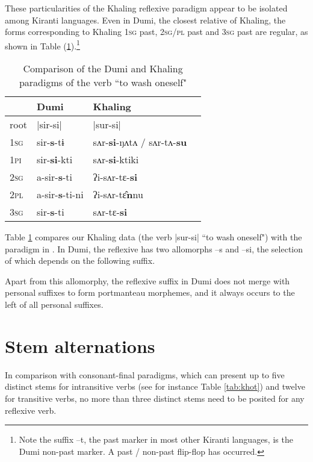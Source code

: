 \documentclass[twoside,a4paper,11pt]{article}
\newcommand{\ipa}[1]{{\phon#1}}
\begin{document}
These particularities of the Khaling reflexive paradigm appear to be isolated among Kiranti languages. Even in Dumi, the closest relative of Khaling, the forms corresponding to Khaling \textsc{1sg} past, \textsc{2sg/pl} past and \textsc{3sg} past are regular, as shown in Table (\ref{tab:dumi-khyal}).\footnote{Note the suffix --\ipa{t}, the past marker in most other Kiranti languages, is the Dumi non-past marker. A past / non-past flip-flop has occurred. } 

\begin{table}[H] \centering
\caption{Comparison of the Dumi and Khaling paradigms of the verb ``to wash oneself"} \label{tab:dumi-khyal}
\begin{tabular}{llll}
\toprule
&	Dumi &	Khaling	\\
\midrule
root & |\ipa{sir-si}| & |\ipa{sur-si}|\\
\midrule
\textsc{1sg} &	\ipa{sir-\textbf{s}-tɨ} &	\ipa{sʌr-\textbf{si}-ŋʌtʌ / sʌr-tʌ-\textbf{su}} &	\\
\textsc{1pi} &	\ipa{sir-\textbf{si}-kti} &	\ipa{sʌr-\textbf{si}-ktiki} &	\\
\textsc{2sg} &	\ipa{a-sir-\textbf{s}-ti} &	\ipa{ʔi-sʌr-tɛ-\textbf{si}} &	\\
\textsc{2pl} &	\ipa{a-sir-\textbf{s}-ti-ni} &	\ipa{ʔi-sʌr-tɛ̂\textbf{n}nu} &	\\
\textsc{3sg} &	\ipa{sir-\textbf{s}-ti} &	\ipa{sʌr-tɛ-\textbf{si}} &	\\
\bottomrule
\end{tabular}
\end{table}


Table \ref{tab:dumi-khyal} compares our Khaling data (the verb |sur-si| ``to wash oneself") with the paradigm in \citet[125;362-3]{driem93dumi}. In Dumi, the reflexive has two allomorphs \ipa{--s} and \ipa{--si}, the selection of which depends on the following suffix. 

Apart from this allomorphy, the reflexive suffix in Dumi does not merge with personal suffixes to form portmanteau morphemes, and it always occurs to the left of all personal suffixes. 

 
 



\section{Stem alternations}
In comparison with consonant-final paradigms, which can present up to five distinct stems for intransitive verbs (see for instance Table \ref{tab:khot}) and twelve for transitive verbs, no more than three distinct stems need to be posited for any reflexive verb.
\end{document}
